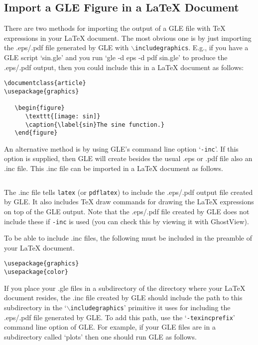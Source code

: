 \subsection{Import a GLE Figure in a LaTeX Document}

There are two methods for importing the output of a GLE file with \TeX{} expressions in your \LaTeX{} document. The most obvious one is by just importing the .eps/.pdf file generated by GLE with \texttt{$\backslash$includegraphics}. E.g., if you have a GLE script `sin.gle' and you run `gle -d eps -d pdf sin.gle' to produce the .eps/.pdf output, then you could include this in a LaTeX document as follows:

\begin{verbatim}
\documentclass{article}
\usepackage{graphics}

   \begin{figure}
      \texttt{[image: sin]}
      \caption{\label{sin}The sine function.}
   \end{figure}

\end{verbatim}

An alternative method is by using GLE's command line option `\texttt{-inc}'. If this option is supplied, then GLE will create besides the usual .eps or .pdf file also an .inc file.  This .inc file can be imported in a \LaTeX{} document as follows.

\begin{verbatim}

\end{verbatim}

The .inc file tells \texttt{latex} (or \texttt{pdflatex}) to include the .eps/.pdf output file created by GLE. It also includes \TeX{} draw commands for drawing the \LaTeX{} expressions on top of the GLE output. Note that the .eps/.pdf file created by GLE does not include these if \texttt{-inc} is used (you can check this by viewing it with GhostView).

To be able to include .inc files, the following must be included in the preamble of your \LaTeX{} document.

\begin{verbatim}
\usepackage{graphics}
\usepackage{color}
\end{verbatim}

\begin{sloppypar}
If you place your .gle files in a subdirectory of the directory where your \LaTeX{} document resides, the .inc file created by GLE should include the path to this subdirectory in the `\texttt{$\backslash$includegraphics}' primitive it uses for including the .eps/.pdf file generated by GLE. To add this path, use the `\texttt{-texincprefix}' command line option of GLE. For example, if your GLE files are in a subdirectory called `plots' then one should run GLE as follows.
\end{sloppypar}

